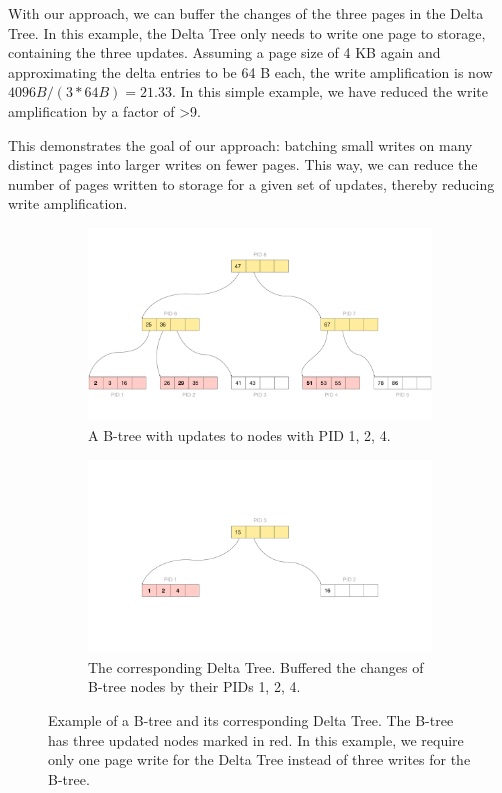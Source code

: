 With our approach, we can buffer the changes of the three pages in the Delta Tree.
In this example, the Delta Tree only needs to write one page to storage, containing the three updates.
Assuming a page size of 4 KB again and approximating the delta entries to be 64 B each, the write amplification is now $4096 B / (3 * 64 B) = 21.33$.
In this simple example, we have reduced the write amplification by a factor of >9.

This demonstrates the goal of our approach: batching small writes on many distinct pages into larger writes on fewer pages.
This way, we can reduce the number of pages written to storage for a given set of updates, thereby reducing write amplification.

\begin{figure}[htpb]
  \centering
  \begin{subfigure}[t]{0.95\textwidth}
    \centering
    \includegraphics[width=\textwidth]{figures/b_tree_with_pid.pdf}
    \caption{A B-tree with updates to nodes with \ac{PID} {1, 2, 4}.}
  \end{subfigure}
  \hfill
  \begin{subfigure}[t]{0.95\textwidth}
    \centering
    \includegraphics[width=\textwidth]{figures/delta_tree_update.pdf}
    \caption{The corresponding Delta Tree. Buffered the changes of B-tree nodes by their \ac{PID}s {1, 2, 4}.}
  \end{subfigure}
  \caption{Example of a B-tree and its corresponding Delta Tree. The B-tree has three updated nodes marked in red. In this example, we require only one page write for the Delta Tree instead of three writes for the B-tree.}
  \label{fig:delta-tree-example}
\end{figure}
